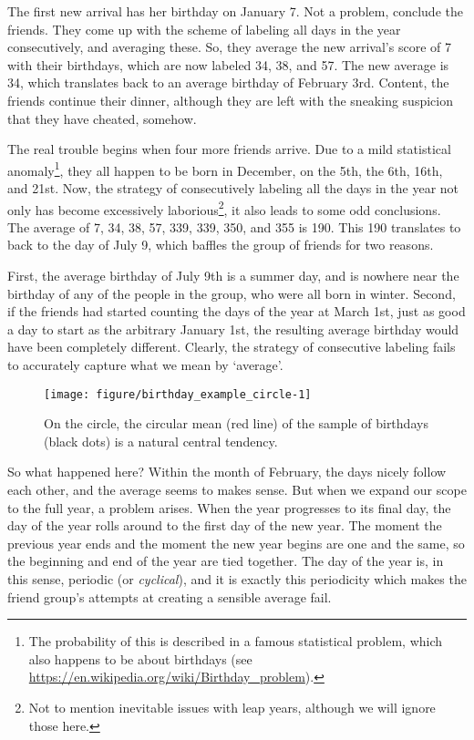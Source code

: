 \documentclass[12pt, a4paper]{book}\usepackage[]{graphicx}\usepackage{xcolor}
\makeatletter
\def\maxwidth{ %
  \ifdim\Gin@nat@width>\linewidth
    \linewidth
  \else
    \Gin@nat@width
  \fi
}
\newenvironment{knitrout}{}{} %
\makeatother
\begin{document}
The first new arrival has her birthday on January 7. Not a problem, conclude the friends. They come up with the scheme of labeling all days in the year consecutively, and averaging these. So, they average the new arrival's score of 7 with their birthdays, which are now labeled 34, 38, and 57. The new average is 34, which translates back to an average birthday of February 3rd. Content, the friends continue their dinner, although they are left with the sneaking suspicion that they have cheated, somehow.




The real trouble begins when four more friends arrive. Due to a mild statistical anomaly\footnote{The probability of this is described in a famous statistical problem, which also happens to be about birthdays (see \url{https://en.wikipedia.org/wiki/Birthday_problem}).}, they all happen to be born in December, on the 5th, the 6th,  16th, and 21st. Now, the strategy of consecutively labeling all the days in the year not only has become excessively laborious\footnote{Not to mention inevitable issues with leap years, although we will ignore those here.}, it also leads to some odd conclusions. The average of 7, 34, 38, 57, 339, 339, 350, and 355 is 190. This 190 translates to back to the day of July 9, which baffles the group of friends for two reasons.

First, the average birthday of July 9th is a summer day, and is nowhere near the birthday of any of the people in the group, who were all born in winter. Second, if the friends had started counting the days of the year at March 1st, just as good a day to start as the arbitrary January 1st, the resulting average birthday would have been completely different. Clearly, the strategy of consecutive labeling fails to accurately capture what we mean by `average'.

\begin{figure}
\begin{knitrout}
\color{fgcolor}
\texttt{[image: figure/birthday\_example\_circle-1]} 

\end{knitrout}
\caption{On the circle, the circular mean (red line) of the sample of birthdays (black dots)  is a natural central tendency.}
\label{birthday_example_circle}
\end{figure}



So what happened here? Within the month of February, the days nicely follow each other, and the average seems to makes sense. But when we expand our scope to the full year, a problem arises. When the year progresses to its final day, the day of the year rolls around to the first day of the new year. The moment the previous year ends and the moment the new year begins are one and the same, so the beginning and end of the year are tied together. The day of the year is, in this sense, periodic (or \textit{cyclical}), and it is exactly this periodicity which makes the friend group's attempts at creating a sensible average fail.
\end{document}
